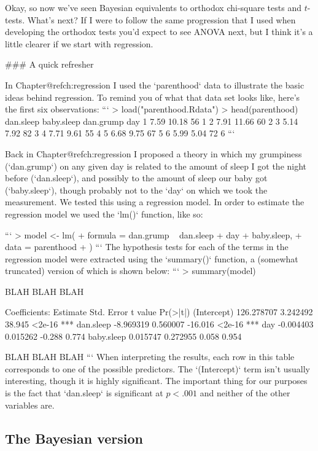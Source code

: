 Okay, so now we've seen Bayesian equivalents to orthodox chi-square tests and $t$-tests. What's next? If I were to follow the same progression that I used when developing the orthodox tests you'd expect to see ANOVA next, but I think it's a little clearer if we start with regression. 

### A quick refresher

In Chapter@refch:regression I used the `parenthood` data to illustrate the basic ideas behind regression. To remind you of what that data set looks like, here's the first six observations:
```
> load("parenthood.Rdata")
> head(parenthood)
  dan.sleep baby.sleep dan.grump day
1      7.59      10.18        56   1
2      7.91      11.66        60   2
3      5.14       7.92        82   3
4      7.71       9.61        55   4
5      6.68       9.75        67   5
6      5.99       5.04        72   6
```


Back in Chapter@refch:regression I proposed a theory in which my grumpiness (`dan.grump`) on any given day is related to the amount of sleep I got the night before (`dan.sleep`), and possibly to the amount of sleep our baby got (`baby.sleep`), though probably not to the `day` on which we took the measurement. We tested this using a regression model. In order to estimate the regression model we used the `lm()` function, like so:

```
> model <- lm( 
+    formula = dan.grump ~ dan.sleep + day + baby.sleep,
+    data = parenthood
+ )
```
The hypothesis tests for each of the terms in the regression model were extracted using the `summary()` function, a (somewhat truncated) version of which is shown below:
```
> summary(model)

BLAH BLAH BLAH

Coefficients:
              Estimate Std. Error t value Pr(>|t|)    
(Intercept) 126.278707   3.242492  38.945   <2e-16 ***
dan.sleep    -8.969319   0.560007 -16.016   <2e-16 ***
day          -0.004403   0.015262  -0.288    0.774    
baby.sleep    0.015747   0.272955   0.058    0.954    

BLAH BLAH BLAH
```
When interpreting the results, each row in this table corresponds to one of the possible predictors. The `(Intercept)` term isn't usually interesting, though it is highly significant. The important thing for our purposes is the fact that `dan.sleep` is significant at $p<.001$ and neither of the other variables are. 

\subsection{The Bayesian version}

